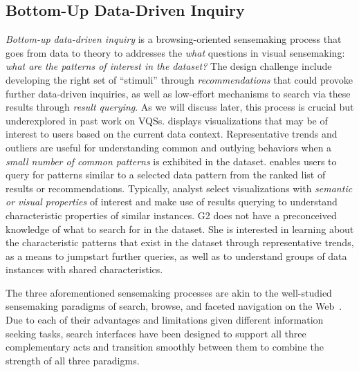   \subsection{Bottom-Up Data-Driven Inquiry}
  \textit{Bottom-up data-driven inquiry} is a browsing-oriented sensemaking process that goes from data to theory to
  addresses the \textit{what} questions in visual sensemaking: \textit{what are the patterns of interest in the dataset?} The design challenge include developing the right set of ``stimuli'' through \textit{recommendations} that could provoke further data-driven inquiries, as well as low-effort mechanisms to search via these results through \textit{result querying}. As we will discuss later, this process is crucial but underexplored in past work on VQSs.
   displays visualizations that may be of interest to users based on the current data context. Representative trends and outliers are useful for understanding common and outlying behaviors when a \emph{small number of common patterns} is exhibited in the dataset. %
   enables users to query for patterns similar to a selected data pattern from the ranked list of results or recommendations. Typically, analyst select visualizations with \emph{semantic or visual properties} of interest and make use of results querying to understand characteristic properties of similar instances.
   G2 does not have a preconceived knowledge of what to search for in the dataset. She is interested in learning about the characteristic patterns that exist in the dataset through representative trends, as a means to jumpstart further queries, as well as to understand groups of data instances with shared characteristics.
  \par The three aforementioned sensemaking processes are akin to the well-studied sensemaking paradigms of search, browse, and faceted navigation on the Web~\cite{Hearst2009,Olston2003}. Due to each of their advantages and limitations given different information seeking tasks, search interfaces have been designed to support all three complementary acts and transition smoothly between them to combine the strength of all three paradigms. 
